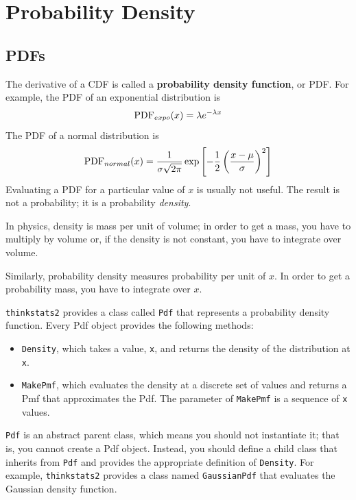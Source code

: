 \documentclass[12pt]{book}
\begin{document}
\chapter{Probability Density}

\section{PDFs}
\label{density}

The derivative of a CDF is called a {\bf probability density function},
or PDF.  For example, the PDF of an exponential distribution is
%
\[ \mathrm{PDF}_{expo}(x) = \lambda e^{-\lambda x}   \]
%
The PDF of a normal distribution is
%
\[ \mathrm{PDF}_{normal}(x) = \frac{1}{\sigma \sqrt{2 \pi}} 
                 \exp \left[ -\frac{1}{2} 
                 \left( \frac{x - \mu}{\sigma} \right)^2 \right]  \]
%
Evaluating a PDF for a particular value of $x$ is usually not useful.
The result is not a probability; it is a probability {\em density}.

In physics, density is mass per unit of
volume; in order to get a mass, you have to multiply by volume or,
if the density is not constant, you have to integrate over volume.

Similarly, probability density measures probability per unit of $x$.
In order to get a probability mass, you have to integrate over $x$.

{\tt thinkstats2} provides a class called {\tt Pdf} that represents
a probability density function.  Every Pdf object provides the
following methods:

\begin{itemize}

\item {\tt Density}, which takes a value, {\tt x}, and returns the
  density of the distribution at {\tt x}.

\item {\tt MakePmf}, which evaluates the density at a discrete set of
  values and returns a Pmf that approximates the Pdf.  The parameter
  of {\tt MakePmf} is a sequence of {\tt x} values.

\end{itemize}  

{\tt Pdf} is an abstract parent class, which means you should not
instantiate it; that is, you cannot create a Pdf object.
Instead, you should define a child class that inherits from {\tt Pdf}
and provides the appropriate definition of {\tt Density}.  For
example, {\tt thinkstats2} provides a class named {\tt GaussianPdf}
that evaluates the Gaussian density function.
\end{document}
